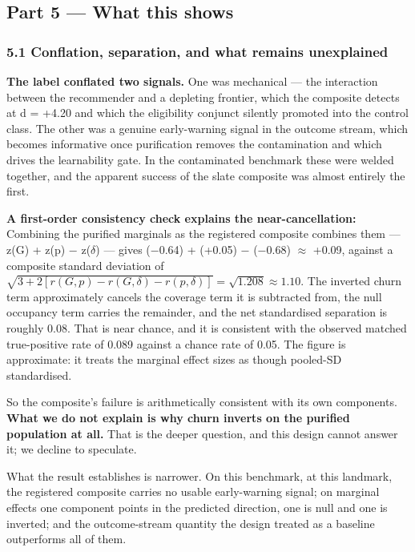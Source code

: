 \documentclass[
  11pt,
]{article}
\begin{document}
\subsection{Part 5 --- What this shows}\label{part-5-what-this-shows}

\subsubsection{5.1 Conflation, separation, and what remains
unexplained}\label{conflation-separation-and-what-remains-unexplained}

\textbf{The label conflated two signals.} One was mechanical --- the
interaction between the recommender and a depleting frontier, which the
composite detects at d = +4.20 and which the eligibility conjunct
silently promoted into the control class. The other was a genuine
early-warning signal in the outcome stream, which becomes informative
once purification removes the contamination and which drives the
learnability gate. In the contaminated benchmark these were welded
together, and the apparent success of the slate composite was almost
entirely the first.

\textbf{A first-order consistency check explains the near-cancellation:}
Combining the purified marginals as the registered composite combines
them --- z(G) + z(p) − z(\(\delta\)) --- gives (−0.64) + (+0.05) −
(−0.68) \(\approx\) +0.09, against a composite standard deviation of
\(\sqrt{3 + 2[r(G,p) - r(G,\delta) - r(p,\delta)]} = \sqrt{1.208} \approx 1.10\).
The inverted churn term approximately cancels the coverage term it is
subtracted from, the null occupancy term carries the remainder, and the
net standardised separation is roughly 0.08. That is near chance, and it
is consistent with the observed matched true-positive rate of 0.089
against a chance rate of 0.05. The figure is approximate: it treats the
marginal effect sizes as though pooled-SD standardised.

So the composite's failure is arithmetically consistent with its own
components. \textbf{What we do not explain is why churn inverts on the
purified population at all.} That is the deeper question, and this
design cannot answer it; we decline to speculate.

What the result establishes is narrower. On this benchmark, at this
landmark, the registered composite carries no usable early-warning
signal; on marginal effects one component points in the predicted
direction, one is null and one is inverted; and the outcome-stream
quantity the design treated as a baseline outperforms all of them.
\end{document}
